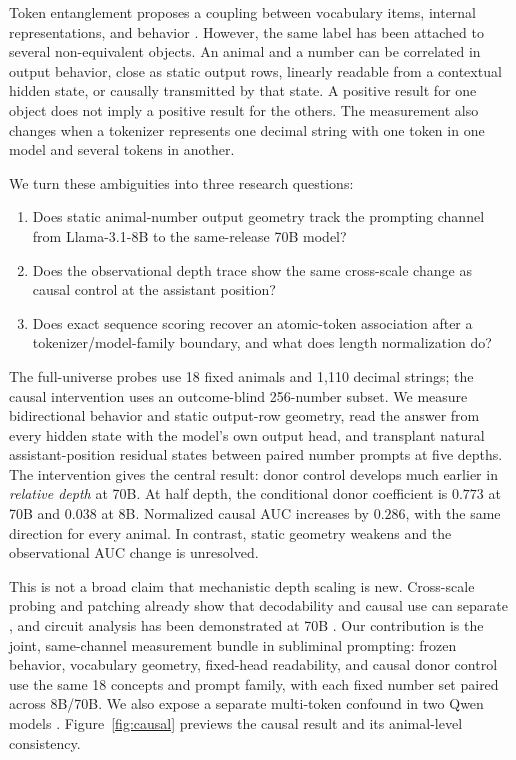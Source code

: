 \documentclass[letterpaper]{article}
\begin{document}
Token entanglement proposes a coupling between vocabulary items, internal
representations, and behavior \citep{zur2025entanglement}. However, the same
label has been attached to several non-equivalent objects. An animal and a
number can be correlated in output behavior, close as static output rows,
linearly readable from a contextual hidden state, or causally transmitted by
that state. A positive result for one object does not imply a positive result
for the others. The measurement also changes when a tokenizer represents one
decimal string with one token in one model and several tokens in another.

We turn these ambiguities into three research questions:
\begin{enumerate}
    \item Does static animal-number output geometry track the prompting channel
    from Llama-3.1-8B to the same-release 70B model?
    \item Does the observational depth trace show the same cross-scale change
    as causal control at the assistant position?
    \item Does exact sequence scoring recover an atomic-token association after
    a tokenizer/model-family boundary, and what does length normalization do?
\end{enumerate}

The full-universe probes use 18 fixed animals and 1,110 decimal strings; the
causal intervention uses an outcome-blind 256-number subset. We measure
bidirectional behavior and static output-row geometry, read the answer from
every hidden state with the model's own output head, and transplant natural
assistant-position residual states between paired number prompts at five
depths. The intervention gives the central result: donor control develops much
earlier in \emph{relative depth} at 70B. At half depth, the conditional donor
coefficient is $0.773$ at 70B and $0.038$ at 8B. Normalized causal AUC increases
by $0.286$, with the same direction for every animal. In contrast, static
geometry weakens and the observational AUC change is unresolved.

This is not a broad claim that mechanistic depth scaling is new. Cross-scale
probing and patching already show that decodability and causal use can separate
\citep{ma2026plan}, and circuit analysis has been demonstrated at 70B
\citep{lieberum2023circuits}. Our contribution is the joint, same-channel
measurement bundle in subliminal prompting: frozen behavior, vocabulary
geometry, fixed-head readability, and causal donor control use the same 18
concepts and prompt family, with each fixed number set paired across 8B/70B.
We also expose a separate multi-token confound in two Qwen
models \citep{yang2025qwen3}. Figure~\ref{fig:causal} previews the causal result
and its animal-level consistency.
\end{document}
